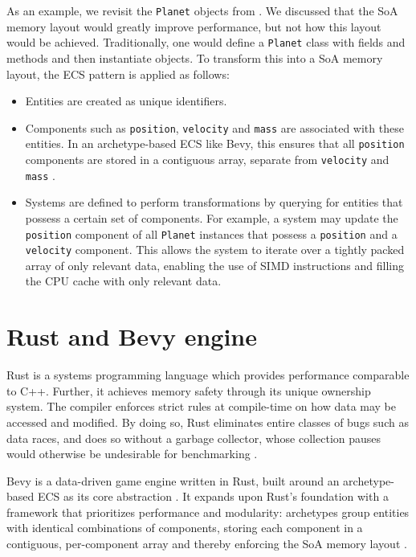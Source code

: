 As an example, we revisit the \texttt{Planet} objects from . We discussed that the \ac{SoA} memory layout would greatly improve performance, but not how this layout would be achieved. Traditionally, one would define a \texttt{Planet} class with fields and methods and then instantiate objects. To transform this into a \ac{SoA} memory layout, the \ac{ECS} pattern is applied as follows:

\begin{itemize}
    \item Entities are created as unique identifiers.
    \item Components such as \texttt{position}, \texttt{velocity} and \texttt{mass} are associated with these entities. In an archetype-based ECS like Bevy, this ensures that all \texttt{position} components are stored in a contiguous array, separate from \texttt{velocity} and \texttt{mass} \cite{bevy_storage}.
    \item Systems are defined to perform transformations by querying for entities that possess a certain set of components. For example, a system may update the \texttt{position} component of all \texttt{Planet} instances that possess a \texttt{position} and a \texttt{velocity} component. This allows the system to iterate over a tightly packed array of only relevant data, enabling the use of \ac{SIMD} instructions and filling the CPU cache with only relevant data.
\end{itemize}

\section{Rust and Bevy engine}
\label{sec:background:rustandbevy}
Rust \cite{klabnik2023rust} is a systems programming language which provides performance comparable to C++. Further, it achieves memory safety through its unique ownership system. The compiler enforces strict rules at compile-time on how data may be accessed and modified. By doing so, Rust eliminates entire classes of bugs such as data races, and does so without a garbage collector, whose collection pauses would otherwise be undesirable for benchmarking \cite{klabnik2023rust}.

Bevy \cite{bevy_engine} is a data-driven game engine written in Rust, built around an archetype-based \ac{ECS} as its core abstraction \cite{bevy_quickstart_ecs}. It expands upon Rust's foundation with a framework that prioritizes performance and modularity: archetypes group entities with identical combinations of components, storing each component in a contiguous, per-component array and thereby enforcing the \ac{SoA} memory layout \cite{bevy_storage}.

